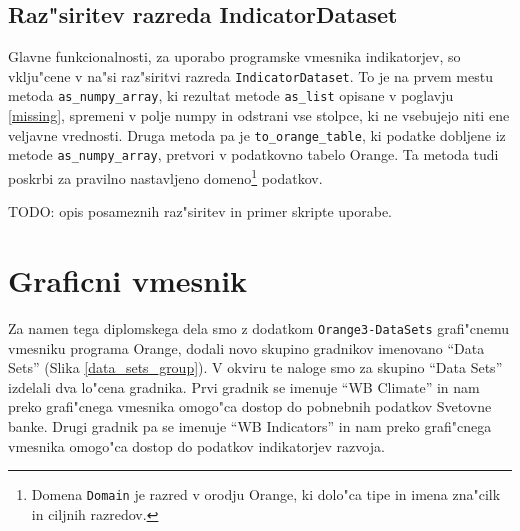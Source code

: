 \subsection{Raz"siritev razreda IndicatorDataset}

Glavne funkcionalnosti, za uporabo programske vmesnika indikatorjev, so
vklju"cene v na"si raz"siritvi razreda \verb|IndicatorDataset|. To je na prvem
mestu metoda \verb|as_numpy_array|, ki rezultat metode \verb|as_list|
opisane v poglavju \ref{missing}, spremeni v polje numpy in odstrani vse
stolpce, ki ne vsebujejo niti ene veljavne vrednosti. Druga metoda pa je
\verb|to_orange_table|, ki podatke dobljene iz metode \verb|as_numpy_array|,
pretvori v podatkovno tabelo Orange. %
Ta metoda tudi poskrbi za pravilno nastavljeno domeno\footnote{Domena
\verb|Domain| je razred v orodju Orange, ki dolo"ca tipe in imena zna"cilk in
ciljnih razredov.} podatkov.


TODO: opis posameznih raz"siritev in primer skripte uporabe.




% 
% 
% 
% 
% 
% 
% 
% 
% 
% 
% 





\section{Graficni vmesnik}

Za namen tega diplomskega dela smo z dodatkom \verb|Orange3-DataSets|
grafi"cnemu vmesniku programa Orange, dodali novo skupino gradnikov imenovano
``Data Sets'' (Slika \ref{data_sets_group}). V okviru te naloge smo za skupino
``Data Sets'' izdelali dva lo"cena gradnika. Prvi gradnik se imenuje ``WB
Climate'' in nam preko grafi"cnega vmesnika omogo"ca dostop do pobnebnih 
podatkov Svetovne banke. Drugi gradnik pa se imenuje ``WB Indicators'' in nam
preko grafi"cnega vmesnika omogo"ca dostop do podatkov indikatorjev razvoja.
 
